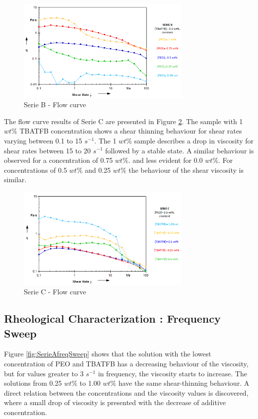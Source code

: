 \begin{figure}[th]
\centering
\includegraphics[width=0.75\textwidth]{./Figures/SerieBflowCurve.png}
\decoRule
\caption[Serie B - Flow curve]{Serie B - Flow curve}
\label{fig:SerieBflowCurve}
\end{figure}

The flow curve results of Serie C are presented in Figure \ref{fig:SerieCflowCurve}. The sample with 1 $w t \%$ TBATFB concentration shows a shear thinning behaviour for shear rates varying between 0.1 to 15 $s^{-1}$. The 1 $w t \%$ sample describes a drop in viscosity for shear rates between 15 to 20 $s^{-1}$ followed by a stable state. A similar behaviour is observed for a concentration of 0.75 $w t \%$. and less evident for 0.0 $w t \%$. For concentrations of 0.5 $w t \%$ and 0.25 $w t \%$ the behaviour of the shear viscosity is similar.

\begin{figure}[th]
\centering
\includegraphics[width=0.75\textwidth]{./Figures/SerieCflowCurve.png}
\decoRule
\caption[Serie C - Flow curve]{Serie C - Flow curve}
\label{fig:SerieCflowCurve}
\end{figure}

\subsection{Rheological Characterization : \textbf{Frequency Sweep}}
Figure \ref{fig:SerieAfreqSweep} shows that the solution with the lowest concentration of PEO and TBATFB has a decreasing behaviour of the viscosity, but for values greater to 3 $s^{-1}$ in frequency, the viscosity starts to increase. The solutions from 0.25 $w t \%$ to 1.00 $w t \%$ have the same shear-thinning behaviour. A direct relation between the concentrations and the viscosity values is discovered, where a small drop of viscosity is presented with the decrease of additive concentration.

